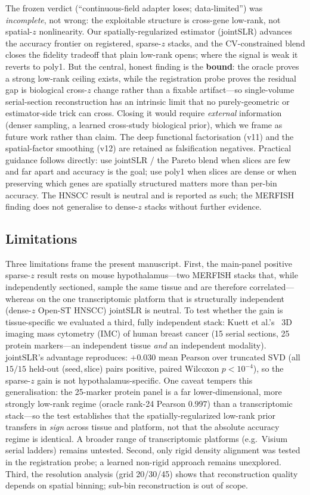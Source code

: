 \documentclass[10pt,letterpaper]{article}
\begin{document}
The frozen verdict (``continuous-field adapter loses; data-limited'') was \emph{incomplete},
not wrong: the exploitable structure is cross-gene low-rank, not spatial-$z$ nonlinearity.
Our spatially-regularized estimator (jointSLR) advances the accuracy frontier on registered,
sparse-$z$ stacks, and the CV-constrained blend closes the fidelity tradeoff that plain
low-rank opens; where the signal is weak it reverts to poly1.
But the central, honest finding is the \textbf{bound}: the oracle proves a strong low-rank
ceiling exists, while the registration probe proves the residual gap is biological cross-$z$
change rather than a fixable artifact---so single-volume serial-section reconstruction has
an intrinsic limit that no purely-geometric or estimator-side trick can cross.
Closing it would require \emph{external} information (denser sampling, a learned
cross-study biological prior), which we frame as future work rather than claim.
The deep functional factorisation (v11) and the spatial-factor smoothing (v12) are retained
as falsification negatives.
Practical guidance follows directly: use jointSLR / the Pareto blend when slices are few
and far apart and accuracy is the goal; use poly1 when slices are dense or when preserving
which genes are spatially structured matters more than per-bin accuracy.
The HNSCC result is neutral and is reported as such; the MERFISH finding does not generalise
to dense-$z$ stacks without further evidence.

\subsection{Limitations}

Three limitations frame the present manuscript.
First, the main-panel positive sparse-$z$ result rests on mouse hypothalamus---two MERFISH
stacks that, while independently sectioned, sample the same tissue and are therefore
correlated---whereas on the one transcriptomic platform that is structurally independent
(dense-$z$ Open-ST HNSCC) jointSLR is neutral. To test whether the gain is tissue-specific we
evaluated a third, fully independent stack: Kuett et al.'s~\cite{kuett} 3D imaging mass cytometry (IMC) of
human breast cancer (15 serial sections, 25 protein markers---an independent tissue \emph{and}
an independent modality). jointSLR's advantage reproduces: $+0.030$ mean Pearson over truncated
SVD (all $15/15$ held-out (seed,\,slice) pairs positive, paired Wilcoxon $p{<}10^{-4}$), so the
sparse-$z$ gain is not hypothalamus-specific. One caveat tempers this generalisation: the
25-marker protein panel is a far lower-dimensional, more strongly low-rank regime (oracle
rank-24 Pearson $0.997$) than a transcriptomic stack---so the test establishes that the
spatially-regularized low-rank prior transfers in \emph{sign} across tissue and platform, not
that the absolute accuracy regime is identical. A broader range of transcriptomic platforms
(e.g.\ Visium serial ladders) remains untested.
Second, only rigid density alignment was tested in the registration probe; a learned
non-rigid approach remains unexplored.
Third, the resolution analysis (grid 20/30/45) shows that reconstruction quality depends on
spatial binning; sub-bin reconstruction is out of scope.
\end{document}
